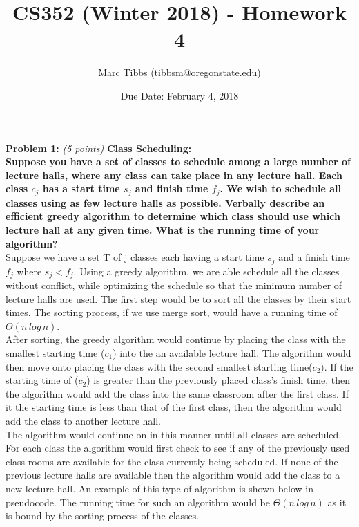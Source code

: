 \documentclass{article}
\title{CS352 (Winter 2018) - Homework 4}
\author{Marc Tibbs (tibbsm@oregonstate.edu)}
\date{Due Date: February 4, 2018}
\begin{document}
\maketitle

\noindent \textbf{Problem 1:} \textit{(5 points)} \textbf{Class Scheduling:}\\

\noindent \textbf{Suppose you have a set of classes to schedule among a large number of lecture halls, where any class can take place in any lecture hall. Each class $c_{j}$ has a start time $s_{j}$ and finish time $f_{j}$. We wish to schedule all classes using as few lecture halls as possible. Verbally describe an efficient greedy algorithm to determine which class should use which lecture hall at any given time. What is the running time of your algorithm?}
\\[.25cm]

Suppose we have a set T of j classes each having a start time $s_j$ and a finish time $f_j$ where $s_j < f_j$. Using a greedy algorithm, we are able schedule all the classes without conflict, while optimizing the schedule so that the minimum number of lecture halls are used. The first step would be to sort all the classes by their start times. The sorting process, if we use merge sort, would have a running time of $\Theta(n\, log\, n)$. 
\\[.25cm]

After sorting, the greedy algorithm would continue by placing the class with the smallest starting time ($c_1$) into the an available lecture hall. The algorithm would then move onto placing the class with the second smallest starting time($c_2)$. If the starting time of ($c_2$) is greater than the previously placed class's finish time, then the algorithm would add the class into the same classroom after the first class. If it the starting time is less than that of the first class, then the algorithm would add the class to another lecture hall. 
\\[.25cm]

The algorithm would continue on in this manner until all classes are scheduled. For each class the algorithm would first check to see if any of the previously used class rooms are available for the class currently being scheduled. If none of the previous lecture halls are available then the algorithm would add the class to a new lecture hall. An example of this type of algorithm is shown below in pseudocode. The running time for such an algorithm would be $\Theta(n\,log\,n)$ as it is bound by the sorting process of the classes.
\\[.15cm]
\end{document}
